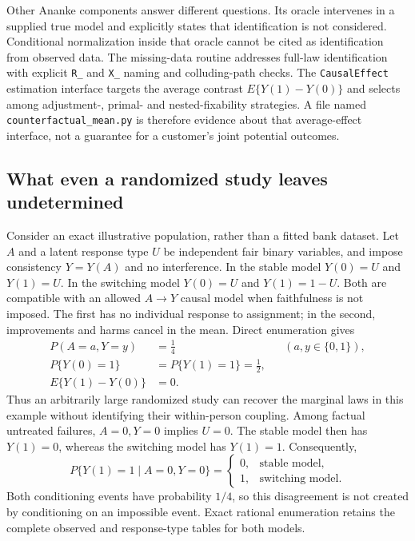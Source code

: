 Other Ananke components answer different questions. Its oracle intervenes in a
supplied true model and explicitly states that identification is not considered.
Conditional normalization inside that oracle cannot be cited as identification
from observed data. The missing-data routine addresses full-law identification
with explicit \texttt{R\_} and \texttt{X\_} naming and colluding-path checks.
The \texttt{CausalEffect} estimation interface targets the average contrast
$E\{Y(1)-Y(0)\}$ and selects among adjustment-, primal- and nested-fixability
strategies. A file named \texttt{counterfactual\_mean.py} is therefore evidence
about that average-effect interface, not a guarantee for a customer's joint
potential outcomes.\citep{exec18_pyid_oracle,exec18_pyid_missing,exec18_pyid_mean}

\subsection{What even a randomized study leaves undetermined}
\label{exec18:pyid-coupling}

Consider an exact illustrative population, rather than a fitted bank dataset.
Let $A$ and a latent response type $U$ be independent fair binary variables,
and impose consistency $Y=Y(A)$ and no interference. In the stable model
$Y(0)=U$ and $Y(1)=U$. In the switching model $Y(0)=U$ and $Y(1)=1-U$.
Both are compatible with an allowed $A\to Y$ causal model when faithfulness
is not imposed. The first has no individual response to assignment; in the
second, improvements and harms cancel in the mean. Direct enumeration gives
\begin{equation}
\begin{aligned}
 P(A=a,Y=y)&=\tfrac14 &&(a,y\in\{0,1\}),\\
 P\{Y(0)=1\}&=P\{Y(1)=1\}=\tfrac12,\\
 E\{Y(1)-Y(0)\}&=0.
\end{aligned}
\label{exec18:pyid-equal-laws}
\end{equation}
Thus an arbitrarily large randomized study can recover the marginal laws in
this example without identifying their within-person coupling. Among factual
untreated failures, $A=0,Y=0$ implies $U=0$. The stable model then has
$Y(1)=0$, whereas the switching model has $Y(1)=1$. Consequently,
\begin{equation}
 P\{Y(1)=1\mid A=0,Y=0\}=
 \begin{cases}0,&\text{stable model},\\1,&\text{switching model}.\end{cases}
\label{exec18:pyid-conditional}
\end{equation}
Both conditioning events have probability $1/4$, so this disagreement is not
created by conditioning on an impossible event. Exact rational enumeration
retains the complete observed and response-type tables for both models.
\citep{exec18_pyid_coupling}

